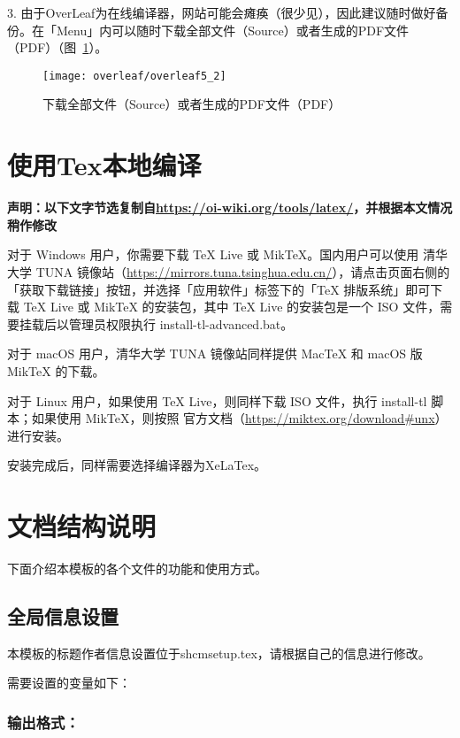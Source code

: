 3. 由于OverLeaf为在线编译器，网站可能会瘫痪（很少见），因此建议随时做好备份。在「Menu」内可以随时下载全部文件（Source）或者生成的PDF文件（PDF）（图~\ref{fig:overleaf5_2}）。

\begin{figure}
	\centering
	\texttt{[image: overleaf/overleaf5\_2]}
	\caption{下载全部文件（Source）或者生成的PDF文件（PDF）}
	\label{fig:overleaf5_2}
\end{figure}

\section{使用Tex本地编译}

\textbf{声明：以下文字节选复制自\url{https://oi-wiki.org/tools/latex/}，并根据本文情况稍作修改}

对于 Windows 用户，你需要下载 TeX Live 或 MikTeX。国内用户可以使用 清华大学 TUNA 镜像站（\url{https://mirrors.tuna.tsinghua.edu.cn/}），请点击页面右侧的「获取下载链接」按钮，并选择「应用软件」标签下的「TeX 排版系统」即可下载 TeX Live 或 MikTeX 的安装包，其中 TeX Live 的安装包是一个 ISO 文件，需要挂载后以管理员权限执行 install-tl-advanced.bat。

对于 macOS 用户，清华大学 TUNA 镜像站同样提供 MacTeX 和 macOS 版 MikTeX 的下载。

对于 Linux 用户，如果使用 TeX Live，则同样下载 ISO 文件，执行 install-tl 脚本；如果使用 MikTeX，则按照 官方文档（\url{https://miktex.org/download\#unx}） 进行安装。

安装完成后，同样需要选择编译器为XeLaTex。

\section{文档结构说明}

下面介绍本模板的各个文件的功能和使用方式。

\subsection{全局信息设置}

本模板的标题作者信息设置位于shcmsetup.tex，请根据自己的信息进行修改。

需要设置的变量如下：

\subsubsection{输出格式：}

